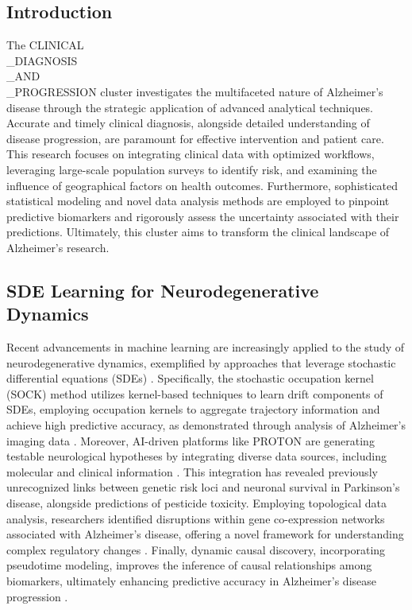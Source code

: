\documentclass[11pt,a4paper]{article}
\begin{document}
\subsection*{Introduction}
The CLINICAL\\\_DIAGNOSIS\\\_AND\\\_PROGRESSION cluster investigates the multifaceted nature of Alzheimer’s disease through the strategic application of advanced analytical techniques. Accurate and timely clinical diagnosis, alongside detailed understanding of disease progression, are paramount for effective intervention and patient care. This research focuses on integrating clinical data with optimized workflows, leveraging large-scale population surveys to identify risk, and examining the influence of geographical factors on health outcomes. Furthermore, sophisticated statistical modeling and novel data analysis methods are employed to pinpoint predictive biomarkers and rigorously assess the uncertainty associated with their predictions. Ultimately, this cluster aims to transform the clinical landscape of Alzheimer’s research.

\subsection{SDE Learning for Neurodegenerative Dynamics}
Recent advancements in machine learning are increasingly applied to the study of neurodegenerative dynamics, exemplified by approaches that leverage stochastic differential equations (SDEs) \cite{arxiv250511622}.  Specifically, the stochastic occupation kernel (SOCK) method utilizes kernel-based techniques to learn drift components of SDEs, employing occupation kernels to aggregate trajectory information and achieve high predictive accuracy, as demonstrated through analysis of Alzheimer's imaging data \cite{arxiv250511622}.  Moreover, AI-driven platforms like PROTON are generating testable neurological hypotheses by integrating diverse data sources, including molecular and clinical information \cite{arxiv251213724}.  This integration has revealed previously unrecognized links between genetic risk loci and neuronal survival in Parkinson’s disease, alongside predictions of pesticide toxicity.  Employing topological data analysis, researchers identified disruptions within gene co-expression networks associated with Alzheimer’s disease, offering a novel framework for understanding complex regulatory changes \cite{arxiv251118238}.  Finally, dynamic causal discovery, incorporating pseudotime modeling, improves the inference of causal relationships among biomarkers, ultimately enhancing predictive accuracy in Alzheimer’s disease progression \cite{arxiv251104619}.
\end{document}
